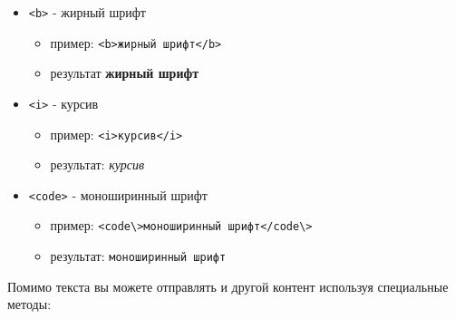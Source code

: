 \documentclass[
]{book}
\providecommand{\tightlist}{%
  \setlength{\itemsep}{0pt}\setlength{\parskip}{0pt}}
\begin{document}
\begin{itemize}
\tightlist
\item
  \texttt{\textless{}b\textgreater{}} - жирный шрифт

  \begin{itemize}
  \tightlist
  \item
    пример: \texttt{\textless{}b\textgreater{}жирный\ шрифт\textless{}/b\textgreater{}}
  \item
    результат \textbf{жирный шрифт}
  \end{itemize}
\item
  \texttt{\textless{}i\textgreater{}} - курсив

  \begin{itemize}
  \tightlist
  \item
    пример: \texttt{\textless{}i\textgreater{}курсив\textless{}/i\textgreater{}}
  \item
    результат: \emph{курсив}
  \end{itemize}
\item
  \texttt{\textless{}code\textgreater{}} - моноширинный шрифт

  \begin{itemize}
  \tightlist
  \item
    пример: \texttt{\textless{}code\textbackslash{}\textgreater{}моноширинный\ шрифт\textless{}/code\textbackslash{}\textgreater{}}
  \item
    результат: \texttt{моноширинный\ шрифт}
  \end{itemize}
\end{itemize}

Помимо текста вы можете отправлять и другой контент используя специальные методы:
\end{document}
